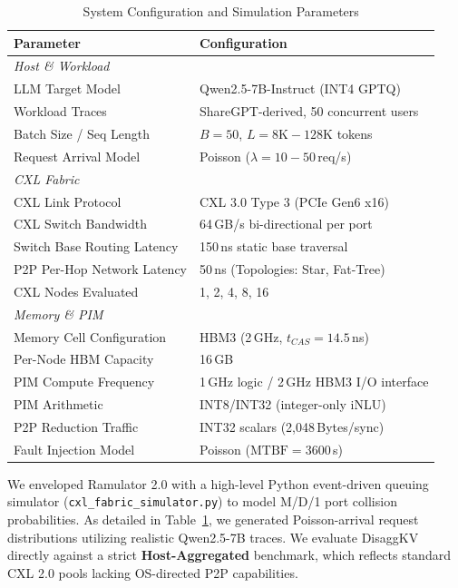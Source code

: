 \documentclass[10pt,conference]{IEEEtran}
\begin{document}
\begin{table}[t]
\caption{System Configuration and Simulation Parameters}
\centering
\begin{tabular}{ll}
\toprule
\textbf{Parameter} & \textbf{Configuration} \\
\midrule
\multicolumn{2}{l}{\textit{Host \& Workload}} \\
LLM Target Model               & Qwen2.5-7B-Instruct (INT4 GPTQ) \\
Workload Traces                 & ShareGPT-derived, 50 concurrent users \\
Batch Size / Seq Length         & $B{=}50$, $L{=}8\text{K}{-}128\text{K}$ tokens \\
Request Arrival Model           & Poisson ($\lambda{=}10{-}50$\,req/s) \\
\midrule
\multicolumn{2}{l}{\textit{CXL Fabric}} \\
CXL Link Protocol               & CXL 3.0 Type 3 (PCIe Gen6 x16) \\
CXL Switch Bandwidth            & 64\,GB/s bi-directional per port \\
Switch Base Routing Latency      & 150\,ns static base traversal \\
P2P Per-Hop Network Latency      & 50\,ns (Topologies: Star, Fat-Tree) \\
CXL Nodes Evaluated              & 1, 2, 4, 8, 16 \\
\midrule
\multicolumn{2}{l}{\textit{Memory \& PIM}} \\
Memory Cell Configuration       & HBM3 (2\,GHz, $t_{CAS}{=}14.5$\,ns) \\
Per-Node HBM Capacity           & 16\,GB \\
PIM Compute Frequency           & 1\,GHz logic / 2\,GHz HBM3 I/O interface \\
PIM Arithmetic                  & INT8/INT32 (integer-only iNLU) \\
P2P Reduction Traffic           & INT32 scalars (2,048\,Bytes/sync) \\
Fault Injection Model           & Poisson ($\text{MTBF}{=}3600$\,s) \\
\bottomrule
\end{tabular}
\label{tab:system_config}
\end{table}

We enveloped Ramulator 2.0 with a high-level Python event-driven queuing simulator (\texttt{cxl\_fabric\_simulator.py}) to model M/D/1 port collision probabilities. As detailed in Table~\ref{tab:system_config}, we generated Poisson-arrival request distributions utilizing realistic Qwen2.5-7B traces. We evaluate DisaggKV directly against a strict \textbf{Host-Aggregated} benchmark, which reflects standard CXL 2.0 pools lacking OS-directed P2P capabilities.
\end{document}
